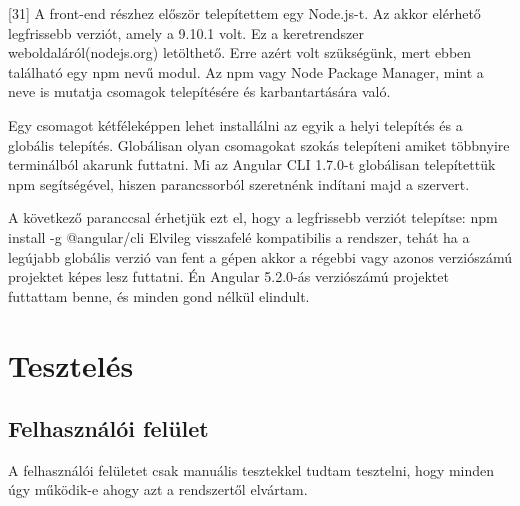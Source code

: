[31] A front-end részhez először telepítettem egy Node.js-t. Az akkor elérhető legfrissebb verziót, amely a 9.10.1 volt. Ez a keretrendszer weboldaláról(nodejs.org) letölthető. Erre azért volt szükségünk, mert ebben található egy npm nevű modul. Az npm vagy Node Package Manager, mint a neve is mutatja csomagok telepítésére és karbantartására való.

Egy csomagot kétféleképpen lehet installálni az egyik a helyi telepítés és a globális telepítés. Globálisan olyan csomagokat szokás telepíteni amiket többnyire terminálból akarunk futtatni.
Mi az Angular CLI 1.7.0-t globálisan telepítettük npm segítségével, hiszen parancssorból szeretnénk indítani majd a szervert.

A következő paranccsal érhetjük ezt el, hogy a legfrissebb verziót telepítse: npm install -g @angular/cli
Elvileg visszafelé kompatibilis a rendszer, tehát ha a legújabb globális verzió van fent a gépen akkor a régebbi vagy azonos verziószámú projektet képes lesz futtatni. Én Angular 5.2.0-ás verziószámú projektet futtattam benne, és minden gond nélkül elindult.

\section{Tesztelés}

\subsection{Felhasználói felület}
A felhasználói felületet csak manuális tesztekkel tudtam tesztelni, hogy minden úgy működik-e ahogy azt a rendszertől elvártam.

\begin{comment}{Ide majd jó lenne azért írni néhány dolgot a frontend és a backend automatizált tesztelésével kapcsolatban is.}
\end{comment}
